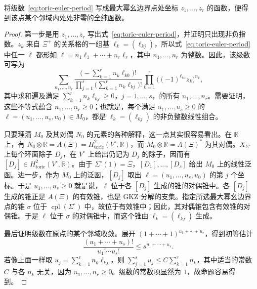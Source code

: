 \begin{proposition}\label{prop:toric-period-holomorphic}
将级数~\eqref{eq:toric-euler-period} 写成最大幂幺边界点处坐标 $z_1,\ldots,z_r$ 的函数，便得到该点某个邻域内处处非零的全纯函数。
\end{proposition}
\begin{proof}
第一步是用 $z_1,\ldots,z_r$ 写出式~\eqref{eq:toric-euler-period}，并证明只出现非负指数。$z_k$ 来自 $\Xi^+$ 的关系格的一组基 $\ell_k=(\ell_{kj})$，所以式~\eqref{eq:toric-euler-period} 中任一 $\ell$ 都形如 $\ell=n_1\ell_1+\cdots+n_r\ell_r$，其中 $n_1,\ldots,n_r$ 为整数。因此，该级数可写为
\begin{equation}\label{eq:toric-period-local-series}
\sum_{n_1,\ldots,n_r}
\frac{\bigl(-\sum_{k=1}^rn_k\ell_{k0}\bigr)!}
{\prod_{j=1}^s\bigl(\sum_{k=1}^rn_k\ell_{kj}\bigr)!}
\prod_{k=1}^r\bigl((-1)^{\ell_{k0}}z_k\bigr)^{n_k},
\end{equation}
其中求和遍及满足 $\sum_{k=1}^rn_k\ell_{kj}\geq0$，$j=1,\ldots,s$，的所有 $n_1,\ldots,n_r$。需要证明，这些不等式蕴含 $n_1,\ldots,n_r\geq0$；也就是，每个满足 $u_1,\ldots,u_s\geq0$ 的
$\ell=(u_1,\ldots,u_s,u_0)\in M_0$，都是 $\ell_k=(\ell_{kj})$ 的非负整数线性组合。

只要理清 $M_0$ 及其对偶 $N_0$ 的元素的各种解释，这一点其实很容易看出。在 $\mathbb R$ 上，有
$N_0\otimes\mathbb R=A(\Xi)=H^2_{\mathrm{toric}}(V^\circ,\mathbb R)$，而 $M_0\otimes\mathbb R=A(\Xi)^*$ 为其对偶。$X_{\Sigma^\circ}$ 上每个环面除子 $D_j$，在 $V^\circ$ 上给出仍记为 $D_j$ 的除子，因而有 $[D_j]\in H^2_{\mathrm{toric}}(V^\circ,\mathbb R)$。由于 $\Sigma^\circ(1)=\Xi$，$[D_1],\ldots,[D_s]$ 给出 $M_0$ 上的线性泛函。进一步，作为 $M_0$ 上的泛函，$[D_j]$ 取出 $\ell=(u_1,\ldots,u_s,u_0)$ 的第 $j$ 个坐标。于是 $u_1,\ldots,u_s\geq0$ 就是说，$\ell$ 位于各 $[D_j]$ 生成的锥的对偶锥中。各 $[D_j]$ 生成的锥正是 $A(\Xi)$ 的有效锥，也是 GKZ 分解的支集。指定所选最大幂幺边界点的锥 $\sigma$ 位于 $\operatorname{cpl}(\Sigma^\circ)$ 中，故位于有效锥中；因此，其对偶锥包含有效锥的对偶锥。于是 $\ell$ 位于 $\sigma$ 的对偶锥中，而这个锥由 $\ell_k=(\ell_{kj})$ 生成。

最后证明级数在原点的某个邻域收敛。展开 $(1+\cdots+1)^{u_1+\cdots+u_s}$，得到初等估计
\[
\frac{(u_1+\cdots+u_s)!}{u_1!\cdots u_s!}\leq s^{u_1+\cdots+u_s}.
\]
若像上面一样取 $u_j=\sum_{k=1}^rn_k\ell_{kj}$，则
$\sum_{j=1}^su_j\leq C\sum_{k=1}^rn_k$，其中适当的常数 $C$ 与各 $n_k$ 无关，因为 $n_1,\ldots,n_r\geq0$。级数的常数项显然为 $1$，故命题容易得到。
\end{proof}

